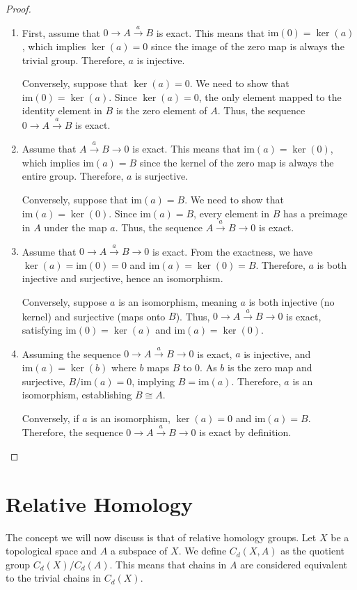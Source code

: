 \begin{proof}
\begin{enumerate}
	\item First, assume that $0 \rightarrow A \xrightarrow{a} B$ is exact. This means that $\mathrm{im}(0) = \ker(a)$, which implies $\ker(a) = 0$ since the image of the zero map is always the trivial group. Therefore, $a$ is injective.

	Conversely, suppose that $\ker(a) = 0$. We need to show that $\mathrm{im}(0) = \ker(a)$. Since $\ker(a) = 0$, the only element mapped to the identity element in $B$ is the zero element of $A$. Thus, the sequence $0 \rightarrow A \xrightarrow{a} B$ is exact.
	\item Assume that $A \xrightarrow{a} B \rightarrow 0$ is exact. This means that $\mathrm{im}(a) = \ker(0)$, which implies $\mathrm{im}(a) = B$ since the kernel of the zero map is always the entire group. Therefore, $a$ is surjective.

	Conversely, suppose that $\mathrm{im}(a) = B$. We need to show that $\mathrm{im}(a) = \ker(0)$. Since $\mathrm{im}(a) = B$, every element in $B$ has a preimage in $A$ under the map $a$. Thus, the sequence $A \xrightarrow{a} B \rightarrow 0$ is exact.
	\item Assume that $0 \rightarrow A \xrightarrow{a} B \rightarrow 0$ is exact. From the exactness, we have $\ker(a) = \mathrm{im}(0) = 0$ and $\mathrm{im}(a) = \ker(0) = B$. Therefore, $a$ is both injective and surjective, hence an isomorphism.

	Conversely, suppose $a$ is an isomorphism, meaning $a$ is both injective (no kernel) and surjective (maps onto $B$). Thus, $0 \rightarrow A \xrightarrow{a} B \rightarrow 0$ is exact, satisfying $\mathrm{im}(0) = \ker(a)$ and $\mathrm{im}(a) = \ker(0)$.
	\item Assuming the sequence $0 \rightarrow A \xrightarrow{a} B \rightarrow 0$ is exact, $a$ is injective, and $\mathrm{im}(a) = \ker(b)$ where $b$ maps $B$ to 0. As $b$ is the zero map and surjective, $B/\mathrm{im}(a) = 0$, implying $B = \mathrm{im}(a)$. Therefore, $a$ is an isomorphism, establishing $B \cong A$.

	Conversely, if $a$ is an isomorphism, $\ker(a) = 0$ and $\mathrm{im}(a) = B$. Therefore, the sequence $0 \rightarrow A \xrightarrow{a} B \rightarrow 0$ is exact by definition.
\end{enumerate}
\end{proof}

\section{Relative Homology}
\label{Relative Homology}
The concept we will now discuss is that of relative homology groups. Let $X$ be a topological space and $A$ a subspace of $X$. We define $C_d(X,A)$ as the quotient group $C_d(X)/C_d(A)$. This means that chains in $A$ are considered equivalent to the trivial chains in $C_d(X)$.

